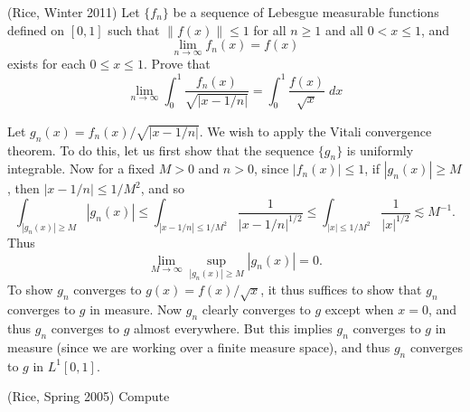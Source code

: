 \documentclass[answers]{exam}
\theoremstyle{problemstyle}
\newcommand{\1}[1]{\textbf{1}_{\left[#1\right]}} %
\begin{document}
\begin{questions}
\question (Rice, Winter 2011) Let $\{ f_n \}$ be a sequence of Lebesgue measurable functions defined on $[0,1]$ such that $\| f(x) \| \leq 1$ for all $n \geq 1$ and all $0 < x \leq 1$, and
\[ \lim_{n \to \infty} f_n(x) = f(x) \]
%
exists for each $0 \leq x \leq 1$. Prove that
%
\[ \lim_{n \to \infty} \int_0^1 \frac{f_n(x)}{\sqrt{|x-1/n|}} = \int_0^1 \frac{f(x)}{\sqrt{x}}\; dx \]
\begin{solution}
    Let $g_n(x) = f_n(x) / \sqrt{|x - 1/n|}$. We wish to apply the Vitali convergence theorem. To do this, let us first show that the sequence $\{ g_n \}$ is uniformly integrable. Now for a fixed $M > 0$ and $n > 0$, since $|f_n(x)| \leq 1$, if $|g_n(x)| \geq M$, then $|x- 1/n| \leq 1/M^2$, and so
    \[ \int_{|g_n(x)| \geq M} |g_n(x)| \leq \int_{|x - 1/n| \leq 1/M^2} \frac{1}{|x - 1/n|^{1/2}} \leq \int_{|x| \leq 1/M^2} \frac{1}{|x|^{1/2}} \lesssim M^{-1}. \]
    Thus
    \[ \lim_{M \to \infty} \sup_{|g_n(x)| \geq M} |g_n(x)| = 0. \]
    To show $g_n$ converges to $g(x) = f(x) / \sqrt{x}$, it thus suffices to show that $g_n$ converges to $g$ in measure. Now $g_n$ clearly converges to $g$ except when $x = 0$, and thus $g_n$ converges to $g$ almost everywhere. But this implies $g_n$ converges to $g$ in measure (since we are working over a finite measure space), and thus $g_n$ converges to $g$ in $L^1[0,1]$.
\end{solution}

\question (Rice, Spring 2005) Compute
%
\end{questions}
\end{document}
